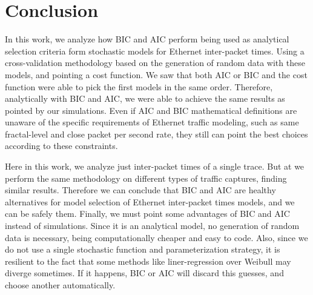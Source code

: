 





\section{Conclusion}

In this work, we analyze how BIC and AIC perform being used as analytical selection criteria form stochastic models for Ethernet inter-packet times. Using a cross-validation methodology based on the generation of random data with these models, and pointing a cost function. We saw that both AIC or BIC and the cost function were able to pick the first models in the same order. Therefore, analytically with BIC and AIC, we were able to achieve the same results as pointed by our simulations. Even if AIC and BIC mathematical definitions are unaware of the specific requirements of Ethernet traffic modeling, such as same fractal-level and close packet per second rate, they still can point the best choices according to these constraints. 

Here in this work, we analyze just inter-packet times of a single trace. But at \cite{projeto-github} we perform the same methodology on different types of traffic captures, finding similar results. Therefore we can conclude that BIC and AIC are healthy alternatives for model selection of Ethernet inter-packet times models, and we can be safely them. Finally, we must point some advantages of BIC and AIC instead of simulations. Since it is an analytical model, no generation of random data is necessary,  being computationally cheaper and easy to code. Also, since we do not use a single stochastic function and parameterization strategy, it is resilient to the fact that some methods like liner-regression over Weibull may diverge sometimes. If it happens, BIC or AIC will discard this guesses, and choose another automatically.

